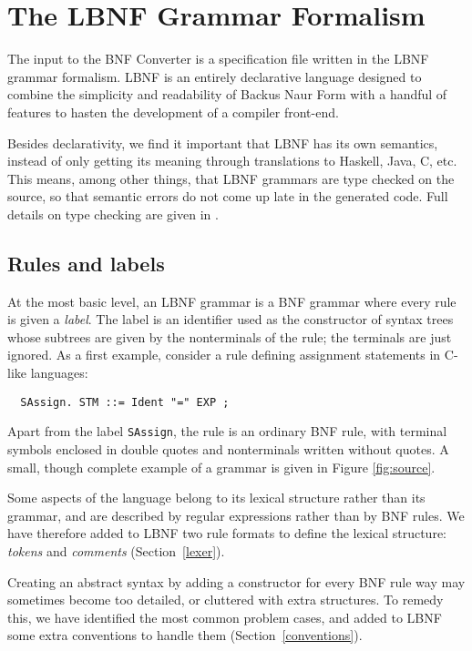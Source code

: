 \newcommand{\commout}[1]{}

\section{The LBNF Grammar Formalism}

\label{lbnf}

The input to the BNF Converter is a specification file written in the 
LBNF grammar formalism. LBNF is an entirely declarative 
language designed to combine the simplicity and readability of 
Backus Naur Form with a handful of features to hasten the development of 
a compiler front-end.

Besides declarativity, we find it important that LBNF has its
own semantics, instead of only getting its meaning through
translations to Haskell, Java, C, etc. This means, among other
things, that LBNF grammars are type checked on the source,
so that semantic errors do not come up late in the generated
code. Full details on type checking are given in \cite{bnfc}.



\subsection{Rules and labels}

At the most basic level, an LBNF grammar is a BNF grammar where 
every rule is given a {\em label}. The label is an identifier 
used as the constructor of syntax trees whose subtrees are 
given by the nonterminals of the rule; the terminals are just ignored.
As a first example, 
consider a rule defining assignment statements in C-like languages:
\begin{verbatim}
  SAssign. STM ::= Ident "=" EXP ;
\end{verbatim}
Apart from the label {\tt SAssign},
the rule is an ordinary BNF rule, with terminal symbols enclosed in
double quotes and nonterminals written without quotes. A small, though 
complete example of a grammar is given in Figure \ref{fig:source}.

Some aspects of the language belong to its lexical
structure rather than its grammar, and are described by
regular expressions rather than by BNF rules. We have therefore
added to LBNF two rule formats to define the lexical structure: 
{\em tokens} and {\em comments} (Section~\ref{lexer}).

Creating an abstract syntax by adding a constructor for every BNF rule
way may sometimes become too detailed, 
or cluttered with extra structures. 
To remedy this, we have identified the most common problem cases, 
and added to LBNF
some extra conventions to handle them (Section~\ref{conventions}).

